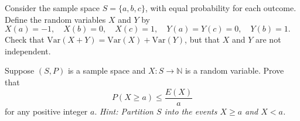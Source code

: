 \documentclass{article}
\theoremstyle{definition}
\begin{document}
\begin{question}
    Consider the sample space $S = \{ a, b, c \}$, with equal probability for each outcome. Define the random variables $X$ and  
    $Y$ by $X(a) = -1, \quad X(b) = 0, \quad X(c) = 1, \quad Y(a) = Y(c) = 0, \quad Y(b) = 1.$ 
    Check that $\mathrm{Var}(X+Y) = \mathrm{Var}(X) + \mathrm{Var}(Y)$, but that $X$ and $Y$ are not independent.
\end{question}
\begin{solution}
\end{solution}

\begin{question}
    Suppose $(S,P)$ is a sample space and $X \colon S \to \mathbb{N}$ is a
    random variable.  Prove that
    \begin{equation*}
        P(X \geq a) \leq \frac{E(X)}{a}
    \end{equation*}
    for any positive integer $a$. 
     \textit{Hint: Partition $S$ into the events $X \geq a$ and $X < a$.}
\end{question}
\begin{solution}
\end{solution}
\end{document}
